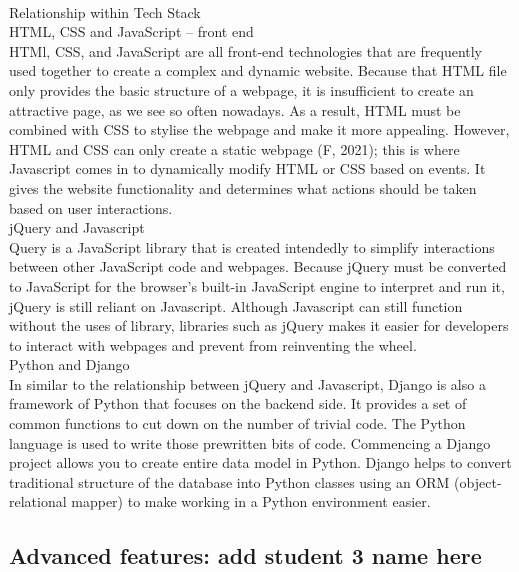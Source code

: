 \documentclass[a4paper, 11pt]{report}
\begin{document}
\\

\noindent Relationship within Tech Stack\\

\noindent HTML, CSS and JavaScript -- front end\\
\noindent HTMl, CSS, and JavaScript are all front-end technologies that are frequently used together to create a complex and dynamic website. Because that HTML file only provides the basic structure of a webpage, it is insufficient to create an attractive page, as we see so often nowadays. As a result, HTML must be combined with CSS to stylise the webpage and make it more appealing. However, HTML and CSS can only create a static webpage (F,  2021); this is where Javascript comes in to dynamically modify HTML or CSS based on events. It gives the website functionality and determines what actions should be taken based on user interactions. \\

\noindent jQuery and Javascript\\
\noindent Query is a JavaScript library that is created intendedly to simplify interactions between other JavaScript code and webpages. Because jQuery must be converted to JavaScript for the browser's built-in JavaScript engine to interpret and run it, jQuery is still reliant on Javascript. Although Javascript can still function without the uses of library, libraries such as  jQuery makes it easier for developers to interact with webpages and  prevent from reinventing the wheel.\\

\noindent Python and Django\\
\noindent In similar to the relationship between jQuery and Javascript, Django is also a framework of Python that focuses on the backend side. It provides a set of common functions to cut down on the number of trivial code. The Python language is used to write those prewritten bits of code. Commencing a Django project allows you to create entire data model in Python. Django helps to convert traditional structure of the database into Python classes using an ORM (object-relational mapper) to make working in a Python environment easier.\\

\subsection{Advanced features: add student 3 name here}
\end{document}
